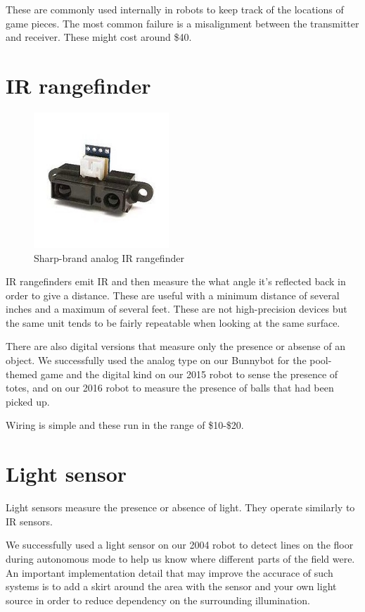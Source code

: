 \documentclass{article}
\begin{document}
These are commonly used internally in robots to keep track of the locations of game pieces.  The most common failure is a misalignment between the transmitter and receiver.  These might cost around \$40.  

\section{IR rangefinder}
\begin{figure}[ht]
\centering
\includegraphics[width=2in]{ir-rangefinder.jpg}
\caption{Sharp-brand analog IR rangefinder}
\end{figure}

IR rangefinders emit IR and then measure the what angle it's reflected back in order to give a distance.  These are useful with a minimum distance of several inches and a maximum of several feet.  These are not high-precision devices but the same unit tends to be fairly repeatable when looking at the same surface.  

There are also digital versions that measure only the presence or absense of an object.  We successfully used the analog type on our Bunnybot for the pool-themed game and the digital kind on our 2015 robot to sense the presence of totes, and on our 2016 robot to measure the presence of balls that had been picked up.  

Wiring is simple and these run in the range of \$10-\$20.
\section{Light sensor}
Light sensors measure the presence or absence of light.  They operate similarly to IR sensors.  

We successfully used a light sensor on our 2004 robot to detect lines on the floor during autonomous mode to help us know where different parts of the field were.  An important implementation detail that may improve the accurace of such systems is to add a skirt around the area with the sensor and your own light source in order to reduce dependency on the surrounding illumination.  
\end{document}
